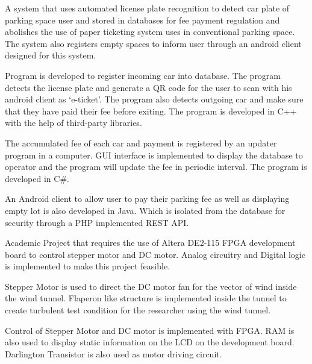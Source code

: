 \documentclass[letterpaper]{deedy-resume} %
\begin{document}
\begin{minipage}[t]{0.33\textwidth}
\end{minipage}
\hfill
\begin{minipage}[t]{0.66\textwidth}

\vspace{\topsep}
\begin{tightitemize}
\item A system that uses automated license plate recognition to detect car plate of parking space user and stored
in databases for fee payment regulation and abolishes the use of paper ticketing system uses in conventional parking space. 
The system also registers empty spaces to inform user through an android client designed for this system.
\item Program is developed to register incoming car into database. 
The program detects the license plate and generate a QR code for the user to scan with his android client as ‘e-ticket’. 
The program also detects outgoing car and make sure that they have paid their fee before exiting. 
The program is developed in C++ with the help of third-party libraries.
\item The accumulated fee of each car and payment is registered by an updater program in a computer. 
GUI interface is implemented to display the database to operator and the program will update the fee in periodic interval. The program is developed in C\#.
\item An Android client to allow user to pay their parking fee as well as displaying empty lot is also developed in Java. 
Which is isolated from the database for security through a PHP implemented REST API.
\end{tightitemize} 
\sectionspace %

\vspace{\topsep}
\begin{tightitemize}
\item Academic Project that requires the use of Altera DE2-115 FPGA development board to control stepper motor and DC motor. Analog circuitry and Digital logic is implemented to make this project feasible.
\item Stepper Motor is used to direct the DC motor fan for the vector of wind inside the wind tunnel. 
Flaperon like structure is implemented inside the tunnel to create turbulent test condition for the researcher using the wind tunnel.
\item Control of Stepper Motor and DC motor is implemented with FPGA. RAM is also used to display static information on the LCD on the development board. Darlington Transistor is also used as motor driving circuit.
\end{tightitemize} 
\sectionspace %


\end{minipage}
\end{document}
